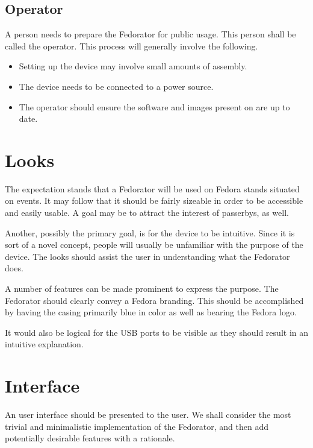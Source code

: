        \subsection{Operator}
            A person needs to prepare the Fedorator for public usage.  This person shall be called the operator.  This process will generally involve the following.
            
            \begin{itemize}
                \item Setting up the device may involve small amounts of assembly.
                \item The device needs to be connected to a power source.
                \item The operator should ensure the software and images present on are up to date.
            \end{itemize}
    \section{Looks}
        The expectation stands that a Fedorator will be used on Fedora stands situated on events.  It may follow that it should be fairly sizeable in order to be accessible and easily usable.  A goal may be to attract the interest of passerbys, as well.
        
        Another, possibly the primary goal, is for the device to be intuitive.  Since it is sort of a novel concept, people will usually be unfamiliar with the purpose of the device.  The looks should assist the user in understanding what the Fedorator does.
        
        A number of features can be made prominent to express the purpose.  The Fedorator should clearly convey a Fedora branding.  This should be accomplished by having the casing primarily blue in color as well as bearing the Fedora logo.
        
        
        It would also be logical for the USB ports to be visible as they should result in an intuitive explanation.
        
    \section{Interface}
        An user interface should be presented to the user.  We shall consider the most trivial and minimalistic implementation of the Fedorator, and then add potentially desirable features with a rationale.
        
